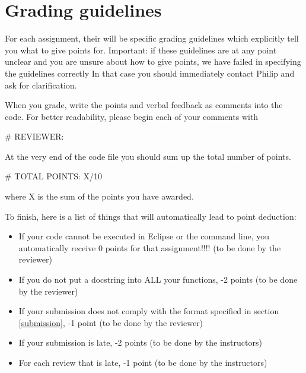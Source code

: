 \documentclass[a4paper, leqno, 11pt]{article}
\begin{document}
\section{Grading guidelines}
For each assignment, their will be specific grading guidelines which explicitly tell you what to give points for. Important: if these
guidelines are at any point unclear and you are unsure about how to give points, we have failed in specifying the guidelines correctly
In that case you should immediately contact Philip and ask for clarification.

When you grade, write the points and verbal feedback as comments into the code. For better readability, please begin each of your comments
with
\begin{center}
\# REVIEWER: 
\end{center}
At the very end of the code file you should sum up the total number of points. 
\begin{center}
\# TOTAL POINTS: X/10 
\end{center}
where X is the sum of the points you have awarded.

To finish, here is a list of things that will automatically lead to point deduction:
\begin{itemize}
\item If your code cannot be executed in Eclipse or the command line, you automatically receive 0 points for that assignment!!!! (to be done by the reviewer) 
\item If you do not put a docstring into ALL your functions, -2 points (to be done by the reviewer)
\item If your submission does not comply with the format specified in section \ref{submission}, -1 point (to be done by the reviewer)
\item If your submission is late, -2 points (to be done by the instructors)
\item For each review that is late, -1 point (to be done by the instructors)
\end{itemize}
\end{document}

